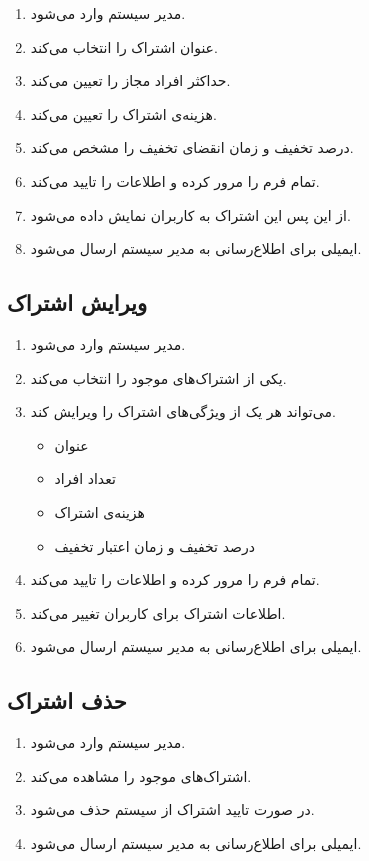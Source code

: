 \documentclass[10pt,a4paper]{article}
\begin{document}
\begin{enumerate}
	\item 
	مدیر سیستم وارد می‌شود.
	\item
	عنوان اشتراک را انتخاب می‌کند.
	\item
	حداکثر افراد مجاز را تعیین می‌کند.
	\item
	هزینه‌ی اشتراک را تعیین می‌کند.
	\item
	درصد تخفیف و زمان انقضای تخفیف را مشخص می‌کند.
	\item
	تمام فرم را مرور کرده و اطلاعات را تایید می‌کند.
	\item
	از این پس این اشتراک به کاربران نمایش داده می‌شود.
		\item
	ایمیلی برای اطلاع‌رسانی به مدیر سیستم ارسال می‌شود.
\end{enumerate}

\subsection{
	ویرایش اشتراک
}
\begin{enumerate}
	\item 
	مدیر سیستم وارد می‌شود.
	\item
یکی از اشتراک‌های موجود را انتخاب می‌کند.
	\item
	می‌تواند هر یک از ویژگی‌های اشتراک را ویرایش کند.
	\begin{itemize}
		\item 
		عنوان
		\item
		تعداد افراد
		\item
		هزینه‌ی اشتراک
		\item
درصد تخفیف و زمان اعتبار تخفیف
	\end{itemize}
	\item
	تمام فرم را مرور کرده و اطلاعات را تایید می‌کند.
	\item
اطلاعات اشتراک برای کاربران تغییر می‌کند.
	\item
ایمیلی برای اطلاع‌رسانی به مدیر سیستم ارسال می‌شود.
\end{enumerate}




\subsection{
	حذف اشتراک
}
\begin{enumerate}
	\item 
	مدیر سیستم وارد می‌شود.
	\item
	اشتراک‌های موجود را مشاهده می‌کند.
	\item
	در صورت تایید اشتراک از سیستم حذف می‌شود.
	\item
	ایمیلی برای اطلاع‌رسانی به مدیر سیستم ارسال می‌شود.
\end{enumerate}
\end{document}
